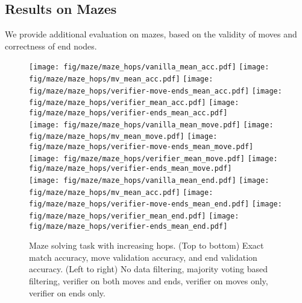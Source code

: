 \subsection{Results on Mazes}\label{sec:maze_full_results}
We provide additional evaluation on mazes, based on the validity of moves and correctness of end nodes. 

\begin{figure}[ht!]
    \centering
    \texttt{[image: fig/maze/maze\_hops/vanilla\_mean\_acc.pdf]}
    \texttt{[image: fig/maze/maze\_hops/mv\_mean\_acc.pdf]}
    \texttt{[image: fig/maze/maze\_hops/verifier-move-ends\_mean\_acc.pdf]}
    \texttt{[image: fig/maze/maze\_hops/verifier\_mean\_acc.pdf]}
    \texttt{[image: fig/maze/maze\_hops/verifier-ends\_mean\_acc.pdf]}    
    \\
    \texttt{[image: fig/maze/maze\_hops/vanilla\_mean\_move.pdf]}
    \texttt{[image: fig/maze/maze\_hops/mv\_mean\_move.pdf]}
    \texttt{[image: fig/maze/maze\_hops/verifier-move-ends\_mean\_move.pdf]}
    \texttt{[image: fig/maze/maze\_hops/verifier\_mean\_move.pdf]}
    \texttt{[image: fig/maze/maze\_hops/verifier-ends\_mean\_move.pdf]}    
    \\
    \texttt{[image: fig/maze/maze\_hops/vanilla\_mean\_end.pdf]}
    \texttt{[image: fig/maze/maze\_hops/mv\_mean\_acc.pdf]}
    \texttt{[image: fig/maze/maze\_hops/verifier-move-ends\_mean\_end.pdf]}
    \texttt{[image: fig/maze/maze\_hops/verifier\_mean\_end.pdf]}
    \texttt{[image: fig/maze/maze\_hops/verifier-ends\_mean\_end.pdf]}    
    \caption{ Maze solving task with increasing hops. (Top to bottom) Exact match accuracy, move validation accuracy, and end validation accuracy.  (Left to right) No data filtering, majority voting based filtering, verifier on both moves and ends, verifier on moves only, verifier on ends only.}
    \label{fig:maze_verifier_hops_full}
\end{figure}



